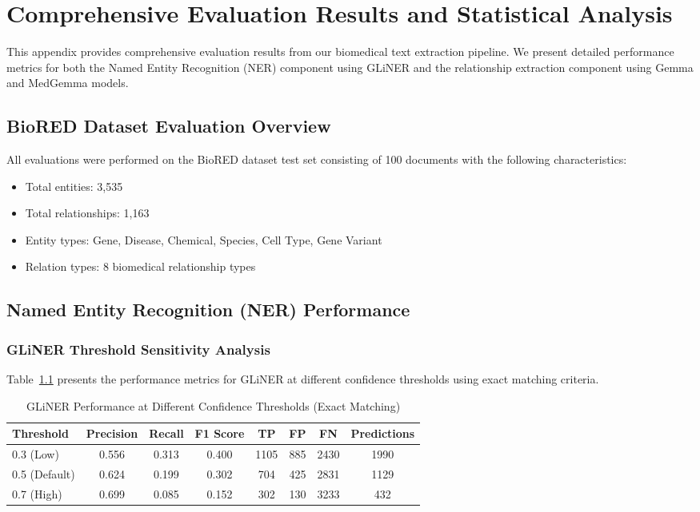 
\chapter{Comprehensive Evaluation Results and Statistical Analysis}

\label{AppendixA} %

This appendix provides comprehensive evaluation results from our biomedical text extraction pipeline. We present detailed performance metrics for both the Named Entity Recognition (NER) component using GLiNER and the relationship extraction component using Gemma and MedGemma models.

\section{BioRED Dataset Evaluation Overview}

All evaluations were performed on the BioRED dataset test set consisting of 100 documents with the following characteristics:
\begin{itemize}
    \item Total entities: 3,535
    \item Total relationships: 1,163
    \item Entity types: Gene, Disease, Chemical, Species, Cell Type, Gene Variant
    \item Relation types: 8 biomedical relationship types
\end{itemize}

\section{Named Entity Recognition (NER) Performance}

\subsection{GLiNER Threshold Sensitivity Analysis}

Table~\ref{tab:gliner-threshold} presents the performance metrics for GLiNER at different confidence thresholds using exact matching criteria.

\begin{table}[htbp]
\centering
\caption{GLiNER Performance at Different Confidence Thresholds (Exact Matching)}
\label{tab:gliner-threshold}
\begin{tabular}{lccccccc}
\toprule
\textbf{Threshold} & \textbf{Precision} & \textbf{Recall} & \textbf{F1 Score} & \textbf{TP} & \textbf{FP} & \textbf{FN} & \textbf{Predictions} \\
\midrule
0.3 (Low) & 0.556 & 0.313 & 0.400 & 1105 & 885 & 2430 & 1990 \\
0.5 (Default) & 0.624 & 0.199 & 0.302 & 704 & 425 & 2831 & 1129 \\
0.7 (High) & 0.699 & 0.085 & 0.152 & 302 & 130 & 3233 & 432 \\
\bottomrule
\end{tabular}
\end{table}

